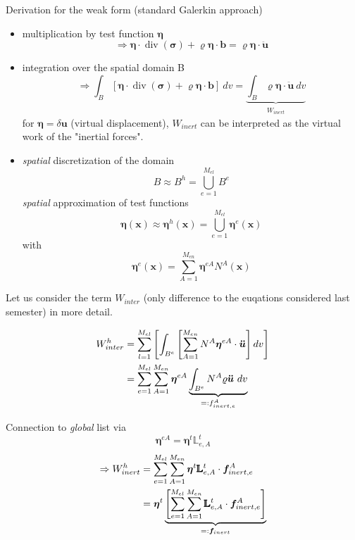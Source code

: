 \documentclass[10pt,a4paper]{article}
\begin{document}
Derivation for the weak form (standard Galerkin approach)
\begin{itemize}
\item multiplication by test function $\bm{\eta}$
\[ \Rightarrow \bm{\eta} \cdot \operatorname{div}(\bm{\sigma}) + \varrho \bm{\eta} \cdot \bm{b} = \varrho \bm{\eta} \cdot \bm{\ddot{u}} \]
\item integration over the spatial domain B
\[ \Rightarrow \int_B [ \bm{\eta} \cdot \operatorname{div}(\bm\sigma) + \varrho \bm\eta \cdot \bm b ] ~dv
= \underbrace{\int_B \varrho \bm\eta \cdot \bm{\ddot{u}} ~dv}_{\substack{W_{inert}}}\]
for $\bm\eta = \delta \bm u$ (virtual displacement), $W_{inert}$ can be interpreted as the virtual work of the "inertial forces".
\item \textit{spatial} discretization of the domain
\[ B \approx B^h = \bigcup_{e=1}^{M_{el}} B^e \]
\textit{spatial} approximation of test functions
\[ \bm\eta(\bm x) \approx \bm\eta^h(\bm x) = \bigcup_{e=1}^{M_{el}} \bm\eta^e (\bm x) \]
with
\[ \bm\eta^e(\bm x) = \sum_{A=1}^{M_{en}} \bm\eta^{eA} N^A(\bm x) \]
\end{itemize}

Let us consider the term $W_{inter}$ (only difference to the euqations considered last semester) in more detail.

\begin{equation}
\begin{aligned}
W_{inter}^h &= \sum_{l=1}^{M_{el}} \left[ \int_{B^e} \left[ \sum_{A=1}^{M_{en}} N^A \bm\eta^{eA} \cdot \bm{\ddot{u}} \right] dv \right] \\
&= \sum_{e=1}^{M_{el}} \sum_{A=1}^{M_{en}} \bm\eta^{eA} \underbrace{\int_{B^e} N^A \varrho \bm{\ddot{u}} ~dv}_{=: f_{inert,e}^A}
\end{aligned}
\notag
\end{equation}

Connection to \textit{global} list via
\[ \bm\eta^{eA} = \bm\eta^t \pmb{\mathbb{L}}_{e,A}^t \]
\begin{equation}
\begin{aligned}
\Rightarrow W_{inert}^h &= \sum_{e=1}^{M_{el}} \sum_{A=1}^{M_{en}} \bm\eta^t \pmb{\mathbb{L}}_{e,A}^t \cdot \bm f_{inert,e}^A \\
&= \bm\eta^t
\underbrace{\left[ \sum_{e=1}^{M_{el}} \sum_{A=1}^{M_{en}} \pmb{\mathbb{L}}_{e,A}^t \cdot \bm f_{inert,e}^A \right]}_{=: \bm f_{inert}}
\end{aligned}
\notag
\end{equation}
\end{document}
